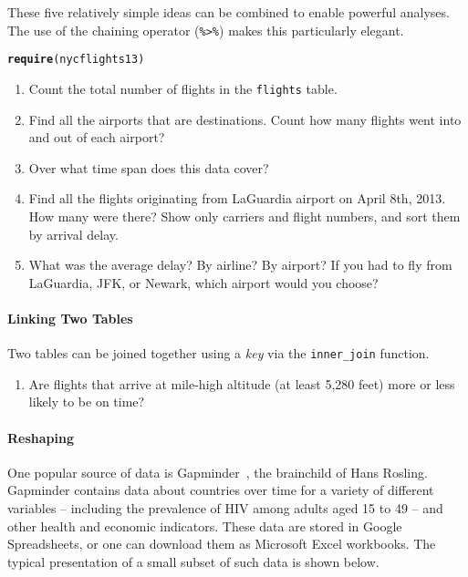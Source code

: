 \documentclass[10pt]{article}\usepackage[]{graphicx}\usepackage[]{color}
\makeatletter
\newcommand{\hlstd}[1]{\textcolor[rgb]{0.345,0.345,0.345}{#1}}%
\newcommand{\hlkwd}[1]{\textcolor[rgb]{0.737,0.353,0.396}{\textbf{#1}}}%
\newenvironment{kframe}{%
 \def\at@end@of@kframe{}%
 \ifinner\ifhmode%
  \def\at@end@of@kframe{\end{minipage}}%
  \begin{minipage}{\columnwidth}%
 \fi\fi%
 \def\FrameCommand##1{\hskip\@totalleftmargin \hskip-\fboxsep
 \colorbox{shadecolor}{##1}\hskip-\fboxsep
     \hskip-\linewidth \hskip-\@totalleftmargin \hskip\columnwidth}%
 \MakeFramed {\advance\hsize-\width
   \@totalleftmargin\z@ \linewidth\hsize
   \@setminipage}}%
 {\par\unskip\endMakeFramed%
 \at@end@of@kframe}
\newenvironment{knitrout}{}{} %
\newcommand{\cmd}[1]{\texttt{#1}}
\makeatother
\begin{document}
These five relatively simple ideas can be combined to enable powerful analyses. The use of the chaining operator (\texttt{\%>\%}) makes this particularly elegant.

\begin{knitrout}
\color{fgcolor}\begin{kframe}
\begin{alltt}
\hlkwd{require}\hlstd{(nycflights13)}
\end{alltt}
\end{kframe}
\end{knitrout}

\begin{enumerate}
  \item Count the total number of flights in the \cmd{flights} table. 
  \item Find all the airports that are destinations. Count how many flights went into and out of each airport?
  \item Over what time span does this data cover? 
  \item Find all the flights originating from LaGuardia airport on April 8th, 2013. How many were there? Show only carriers and flight numbers, and sort them by arrival delay. 
  \item What was the average delay? By airline? By airport? If you had to fly from LaGuardia, JFK, or Newark, which airport would you choose? 
\end{enumerate}

\paragraph{Linking Two Tables}

Two tables can be joined together using a \emph{key} via the \cmd{inner\_join} function. 

\begin{enumerate}
  \item Are flights that arrive at mile-high altitude (at least 5,280 feet) more or less likely to be on time?  
\end{enumerate}

\paragraph{Reshaping}

One popular source of data is Gapminder~\cite{}, the brainchild of Hans Rosling. Gapminder contains data about countries over time for a variety of different variables -- including the prevalence of HIV among adults aged 15 to 49 -- and other health and economic indicators. These data are stored in Google Spreadsheets, or one can download them as Microsoft Excel workbooks. The typical presentation of a small subset of such data is shown below. 
\end{document}
